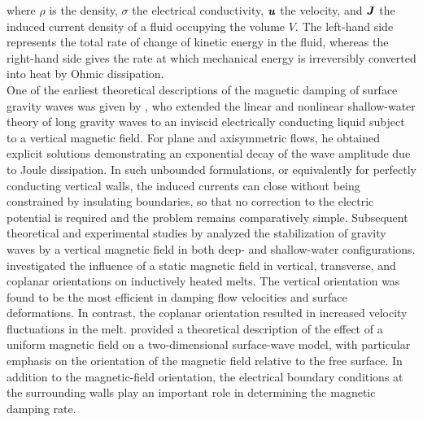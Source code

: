 \documentclass[aps,prfluids,reprint,superscriptaddress]{revtex4-2}
\newcommand{\h}[1]{\textbf{\textit{#1}}}
\begin{document}
where $\rho$ is the density, $\sigma$ the electrical conductivity, $\h u$ the velocity, and $\h J$ the induced current density of a fluid occupying the volume $V$. The left-hand side represents the total rate of change of kinetic energy in the fluid, whereas the right-hand side gives the rate at which mechanical energy is irreversibly converted into heat by Ohmic dissipation.
\\
\indent One of the earliest theoretical descriptions of the magnetic damping of surface gravity waves was given by \citet{Fraenkel1960}, who extended the linear and nonlinear shallow-water theory of long gravity waves to an inviscid electrically conducting liquid subject to a vertical magnetic field. For plane and axisymmetric flows, he obtained explicit solutions demonstrating an exponential decay of the wave amplitude due to Joule dissipation. In such unbounded formulations, or equivalently for perfectly conducting vertical walls, the induced currents can close without being constrained by insulating boundaries, so that no correction to the electric potential is required and the problem remains comparatively simple. Subsequent theoretical and experimental studies by \citet{Rivat1991} analyzed the stabilization of gravity waves by a vertical magnetic field in both deep- and shallow-water configurations. \citet{Bojarevics2006a} investigated the influence of a static magnetic field in vertical, transverse, and coplanar orientations on inductively heated melts. The vertical orientation was found to be the most efficient in damping flow velocities and surface deformations. In contrast, the coplanar orientation resulted in increased velocity fluctuations in the melt. \citet{Alcala2015} provided a theoretical description of the effect of a uniform magnetic field on a two-dimensional surface-wave model, with particular emphasis on the orientation of the magnetic field relative to the free surface. In addition to the magnetic-field orientation, the electrical boundary conditions at the surrounding walls play an important role in determining the magnetic damping rate. 
\end{document}
